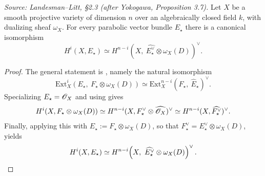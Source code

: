 \begin{proposition}
  \label{prop:serre-duality}
  \textit{Source: Landesman--Litt, \S2.3 (after Yokogawa, Proposition 3.7).}
  Let $X$ be a smooth projective variety of dimension $n$ over an algebraically
  closed field $k$, with dualizing sheaf $\omega_X$. For every parabolic vector
  bundle $E_\star$ there is a canonical isomorphism
  \[
    H^i(X, E_\star) \simeq H^{n-i}\!\left(X,\ \widehat{E^\vee_\star} \otimes
      \omega_X(D)\right)^{\vee} .
  \]
\end{proposition}

\begin{proof}
  The general statement is \cite[Proposition
  3.7]{yokogawa:infinitesimal-deformation}, namely the natural isomorphism
  \[
    \mathrm{Ext}^i_X(E_\star,\ F_\star \otimes \omega_X(D)) \simeq
      \mathrm{Ext}^{n-i}_X(F_\star,\ \widehat{E}_\star)^{\vee} .
  \]
  Specializing $E_\star = \mathscr{O}_X$ and using \cite[Lemma
  3.6]{yokogawa:infinitesimal-deformation} gives
  \[
    H^i(X, F_\star \otimes \omega_X(D)) \simeq
      H^{n-i}(X, F^\vee_\star \otimes \widehat{\mathscr{O}_X})^{\vee} \simeq
      H^{n-i}(X, \widehat{F^\vee_\star})^{\vee} .
  \]
  Finally, applying this with $E_\star := F_\star \otimes \omega_X(D)$, so that
  $F^\vee_\star = E^\vee_\star \otimes \omega_X(D)$, yields
  \[
    H^i(X, E_\star) \simeq H^{n-i}\!\left(X,\ \widehat{E^\vee_\star} \otimes
      \omega_X(D)\right)^{\vee} . \qedhere
  \]
\end{proof}
